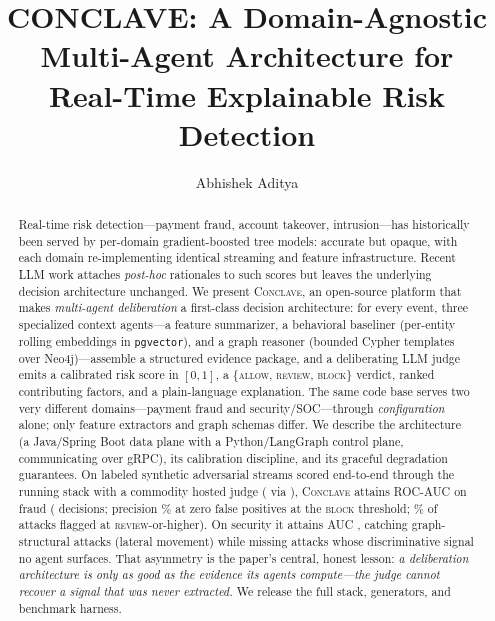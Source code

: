 \documentclass[sigconf,nonacm,screen]{acmart}
\begin{document}
\title{CONCLAVE: A Domain-Agnostic Multi-Agent Architecture for\\Real-Time Explainable Risk Detection}

\author{Abhishek Aditya}

\renewcommand{\shortauthors}{Aditya}

\begin{abstract}
Real-time risk detection---payment fraud, account takeover, intrusion---has
historically been served by per-domain gradient-boosted tree models: accurate
but opaque, with each domain re-implementing identical streaming and feature
infrastructure. Recent LLM work attaches \emph{post-hoc} rationales to such
scores but leaves the underlying decision architecture unchanged. We present
\textsc{Conclave}, an open-source platform that makes \emph{multi-agent
deliberation} a first-class decision architecture: for every event, three
specialized context agents---a feature summarizer, a behavioral baseliner
(per-entity rolling embeddings in \texttt{pgvector}), and a graph reasoner
(bounded Cypher templates over Neo4j)---assemble a structured evidence package,
and a deliberating LLM judge emits a calibrated risk score in $[0,1]$, a
\{\textsc{allow}, \textsc{review}, \textsc{block}\} verdict, ranked
contributing factors, and a plain-language explanation. The same code base
serves two very different domains---payment fraud and security/SOC---through
\emph{configuration} alone; only feature extractors and graph schemas differ.
We describe the architecture (a Java/Spring Boot data plane with a
Python/LangGraph control plane, communicating over gRPC), its calibration
discipline, and its graceful degradation guarantees. On labeled synthetic
adversarial streams scored end-to-end through the running stack with a
commodity hosted judge (\judgemodel{} via \judgeendpoint), \textsc{Conclave}
attains ROC-AUC \fraudauc{} on fraud (\fraudndec{} decisions; precision
\fraudblockprec\% at zero false positives at the \textsc{block} threshold;
\fraudflagrec\% of attacks flagged at \textsc{review}-or-higher). On security
it attains AUC \secauc{}, catching graph-structural attacks (lateral movement)
while missing attacks whose discriminative signal no agent surfaces. That
asymmetry is the paper's central, honest lesson: \emph{a deliberation
architecture is only as good as the evidence its agents compute---the judge
cannot recover a signal that was never extracted.} We release the full stack,
generators, and benchmark harness.
\end{abstract}
\end{document}
